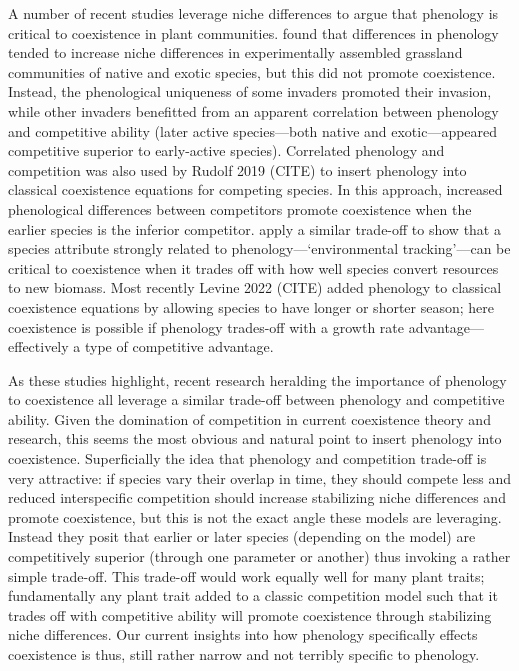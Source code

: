 \documentclass[11pt]{article}
\begin{document}
A number of recent studies leverage niche differences to argue that phenology is critical to coexistence in plant communities. \citet{godoy2014} found that differences in phenology tended to increase niche differences in experimentally assembled grassland communities of native and exotic species, but this did not promote coexistence. Instead, the phenological uniqueness of some invaders promoted their invasion, while other invaders benefitted from an apparent correlation between phenology and competitive ability (later active species---both native and exotic---appeared competitive superior to early-active species). Correlated phenology and competition was also used by Rudolf 2019 (CITE) to insert phenology into classical coexistence equations for competing species. In this approach, increased phenological differences between competitors promote coexistence when the earlier species is the inferior competitor. \citet{memegan2021} apply a similar trade-off to show that a species attribute strongly related to phenology---`environmental tracking'---can be critical to coexistence when it trades off with how well species convert resources to new biomass. Most recently Levine 2022 (CITE) added phenology to classical coexistence equations by allowing species to have longer or shorter season; here coexistence is possible if phenology trades-off with a growth rate advantage---effectively a type of competitive advantage.  

As these studies highlight, recent research heralding the importance of phenology to coexistence all leverage a similar trade-off between phenology and competitive ability. Given the domination of competition in current coexistence theory and research, this seems the most obvious and natural point to insert phenology into coexistence. Superficially the idea that phenology and competition trade-off is very attractive: if species vary their overlap in time, they should compete less and reduced interspecific competition should increase stabilizing niche differences and promote coexistence, but this is not the exact angle these models are leveraging. Instead they posit that earlier or later species (depending on the model) are competitively superior (through one parameter or another) thus invoking a rather simple trade-off. This trade-off would work equally well for many plant traits; fundamentally any plant trait added to a classic competition model such that it trades off with competitive ability will promote coexistence through stabilizing niche differences. Our current insights into how phenology specifically effects coexistence is thus, still rather narrow and not terribly specific to phenology. 
\end{document}

